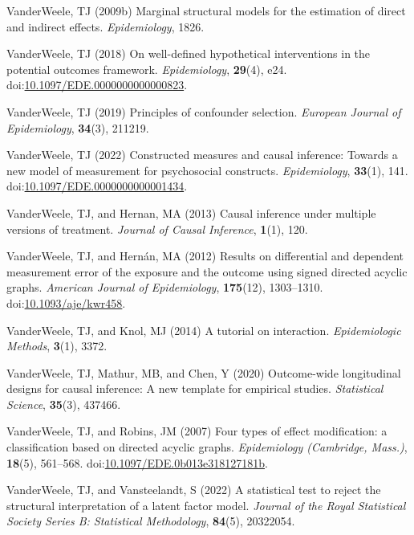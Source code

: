 \documentclass[
  singlecolumn,
  9pt]{article}
\begin{document}
\begin{CSLReferences}
VanderWeele, TJ (2009b) Marginal structural models for the estimation of
direct and indirect effects. \emph{Epidemiology}, 1826.

VanderWeele, TJ (2018) On well-defined hypothetical interventions in the
potential outcomes framework. \emph{Epidemiology}, \textbf{29}(4), e24.
doi:\href{https://doi.org/10.1097/EDE.0000000000000823}{10.1097/EDE.0000000000000823}.

VanderWeele, TJ (2019) Principles of confounder selection.
\emph{European Journal of Epidemiology}, \textbf{34}(3), 211219.

VanderWeele, TJ (2022) Constructed measures and causal inference:
Towards a new model of measurement for psychosocial constructs.
\emph{Epidemiology}, \textbf{33}(1), 141.
doi:\href{https://doi.org/10.1097/EDE.0000000000001434}{10.1097/EDE.0000000000001434}.

VanderWeele, TJ, and Hernan, MA (2013) Causal inference under multiple
versions of treatment. \emph{Journal of Causal Inference},
\textbf{1}(1), 120.

VanderWeele, TJ, and Hernán, MA (2012) Results on differential and
dependent measurement error of the exposure and the outcome using signed
directed acyclic graphs. \emph{American Journal of Epidemiology},
\textbf{175}(12), 1303--1310.
doi:\href{https://doi.org/10.1093/aje/kwr458}{10.1093/aje/kwr458}.

VanderWeele, TJ, and Knol, MJ (2014) A tutorial on interaction.
\emph{Epidemiologic Methods}, \textbf{3}(1), 3372.

VanderWeele, TJ, Mathur, MB, and Chen, Y (2020) Outcome-wide
longitudinal designs for causal inference: A new template for empirical
studies. \emph{Statistical Science}, \textbf{35}(3), 437466.

VanderWeele, TJ, and Robins, JM (2007) Four types of effect
modification: a classification based on directed acyclic graphs.
\emph{Epidemiology (Cambridge, Mass.)}, \textbf{18}(5), 561--568.
doi:\href{https://doi.org/10.1097/EDE.0b013e318127181b}{10.1097/EDE.0b013e318127181b}.

VanderWeele, TJ, and Vansteelandt, S (2022) A statistical test to reject
the structural interpretation of a latent factor model. \emph{Journal of
the Royal Statistical Society Series B: Statistical Methodology},
\textbf{84}(5), 20322054.


\end{CSLReferences}
\end{document}
